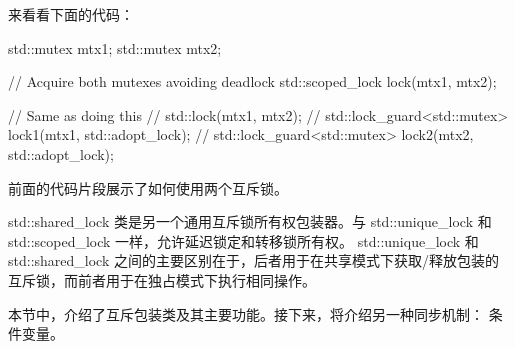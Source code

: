 来看看下面的代码：

\begin{cpp}
std::mutex mtx1;
std::mutex mtx2;

// Acquire both mutexes avoiding deadlock
std::scoped_lock lock(mtx1, mtx2);

// Same as doing this
// std::lock(mtx1, mtx2);
// std::lock_guard<std::mutex> lock1(mtx1, std::adopt_lock);
// std::lock_guard<std::mutex> lock2(mtx2, std::adopt_lock);
\end{cpp}

前面的代码片段展示了如何使用两个互斥锁。


std::shared\_lock 类是另一个通用互斥锁所有权包装器。与 std::unique\_lock 和 std::scoped\_lock 一样，允许延迟锁定和转移锁所有权。 std::unique\_lock 和 std::shared\_lock 之间的主要区别在于，后者用于在共享模式下获取/释放包装的互斥锁，而前者用于在独占模式下执行相同操作。

本节中，介绍了互斥包装类及其主要功能。接下来，将介绍另一种同步机制： 条件变量。













